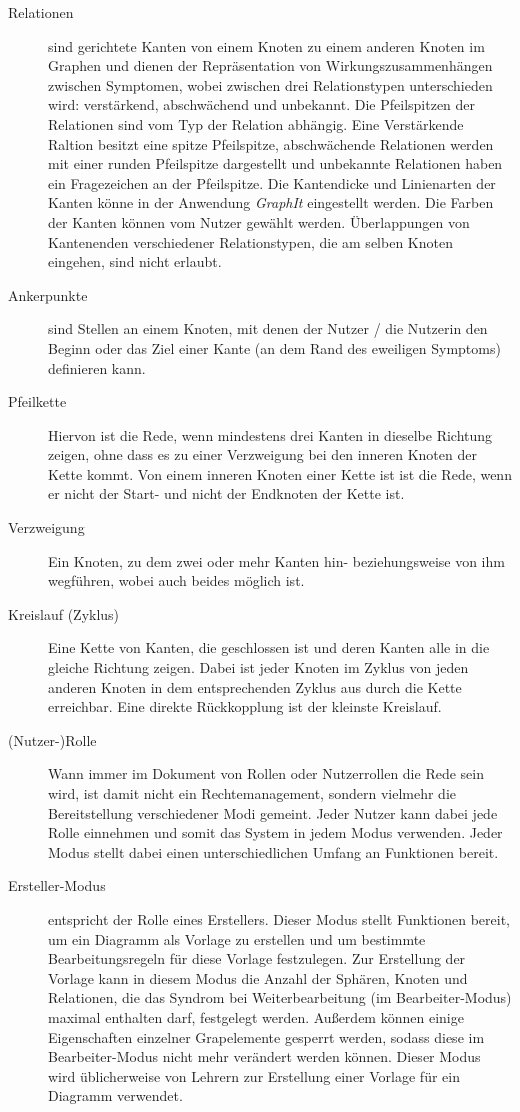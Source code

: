 \documentclass[enabledeprecatedfontcommands,fontsize=11pt,paper=a4,twoside]{scrartcl}
\newcounter{one}
\begin{document}
\begin{description}
	\item[Relationen] sind gerichtete Kanten von einem Knoten zu einem anderen Knoten im Graphen und dienen der Repräsentation von Wirkungszusammenhängen zwischen Symptomen, wobei zwischen drei Relationstypen unterschieden wird: verstärkend, abschwächend und unbekannt. Die Pfeilspitzen der Relationen sind vom Typ der Relation abhängig. Eine Verstärkende Raltion besitzt eine spitze Pfeilspitze, abschwächende Relationen werden mit einer runden Pfeilspitze dargestellt und unbekannte Relationen haben ein Fragezeichen an der Pfeilspitze. Die Kantendicke und Linienarten der Kanten könne in der Anwendung \textit{GraphIt} eingestellt werden. Die Farben der Kanten können vom Nutzer gewählt werden. Überlappungen von Kantenenden verschiedener Relationstypen, die am selben Knoten eingehen, sind nicht erlaubt.
	\item[Ankerpunkte] sind Stellen an einem Knoten, mit denen der Nutzer / die Nutzerin den Beginn oder das Ziel einer Kante (an dem Rand des eweiligen Symptoms) definieren kann. 
	\item[Pfeilkette] Hiervon ist die Rede, wenn mindestens drei Kanten in dieselbe Richtung zeigen, ohne dass es zu einer Verzweigung bei den inneren Knoten der Kette kommt. Von einem inneren Knoten einer Kette ist ist die Rede, wenn er nicht der Start- und nicht der Endknoten der Kette ist. 
	\item[Verzweigung] Ein Knoten, zu dem zwei oder mehr Kanten hin- beziehungsweise von ihm wegführen, wobei auch beides möglich ist. 
	\item[Kreislauf (Zyklus)] Eine Kette von Kanten, die geschlossen ist und deren Kanten alle in die gleiche Richtung zeigen. Dabei ist jeder Knoten im Zyklus von jeden anderen Knoten in dem entsprechenden Zyklus aus durch die Kette erreichbar. Eine direkte Rückkopplung ist der kleinste Kreislauf.
	\item[(Nutzer-)Rolle] Wann immer im Dokument von Rollen oder Nutzerrollen die Rede sein wird, ist damit nicht ein Rechtemanagement, sondern vielmehr die Bereitstellung verschiedener Modi gemeint. Jeder Nutzer kann dabei jede Rolle einnehmen und somit das System in jedem Modus verwenden. Jeder Modus stellt dabei einen unterschiedlichen Umfang an Funktionen bereit.
	\item[Ersteller-Modus] entspricht der Rolle eines Erstellers. Dieser Modus stellt Funktionen bereit, um ein Diagramm als Vorlage zu erstellen und um bestimmte Bearbeitungsregeln für diese Vorlage festzulegen. Zur Erstellung der Vorlage kann in diesem Modus die Anzahl der Sphären, Knoten und Relationen, die das Syndrom bei Weiterbearbeitung (im Bearbeiter-Modus) maximal enthalten darf, festgelegt werden. Außerdem können einige Eigenschaften einzelner Grapelemente gesperrt werden, sodass diese im Bearbeiter-Modus nicht mehr verändert werden können. Dieser Modus wird üblicherweise von Lehrern zur Erstellung einer Vorlage für ein Diagramm verwendet.

\end{description}
\end{document}
